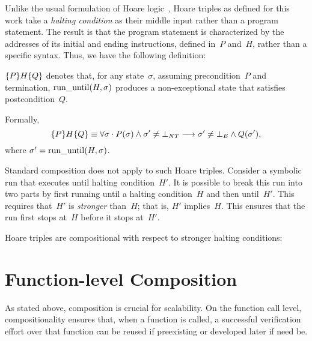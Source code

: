Unlike the usual formulation of
Hoare logic~\citep{hoare1969axiomatic,myreen2007hoare},
Hoare triples as defined for this work take a \emph{halting condition}%
%
as their middle input rather than a program statement.
The result is that the program statement is
characterized by the addresses of its initial
and ending instructions, defined in~$P$ and~$H$, rather than a specific syntax.
Thus, we have the following definition:
\begin{definition}\label{def:htriple}
  $\htriple{P}{H}{Q}$
  denotes that, for any state~$\sigma$, assuming precondition~$P$ and termination,
  $\run(H,\sigma)$ produces a non-exceptional state that satisfies postcondition~$Q$.
  
  Formally,
  \begin{equation}
    \htriple{P}{H}{Q}\equiv\forall\sigma\cdot
    P(\sigma)\wedge\sigma'\neq\bot_{\var{NT}}\longrightarrow
    \sigma'\neq\bot_E\wedge Q(\sigma'),
  \end{equation}
  where $\sigma'=\run(H,\sigma)$.
\end{definition}

Standard composition does not apply to such Hoare triples.
Consider a symbolic run that executes until halting condition~$H'$.%
It is possible to break this run into two parts
by first running until a halting condition~$H$ and then until~$H'$.
This requires that~$H'$ is \emph{stronger} than~$H$; that is, $H'$ implies~$H$.
This ensures that the run first stops at~$H$ before it stops at~$H'$.
\begin{theorem}\label{thm:comp}
  Hoare triples are compositional with respect to stronger halting conditions:
  \begin{prooftree}
  \end{prooftree}
\end{theorem}

\section{Function-level Composition}\label{se:cfg_composition}
As stated above, composition is crucial for scalability.%
On the function call level, compositionality ensures that, when a function is called,
a successful verification effort over that function can be reused
if preexisting or developed later if need be.

